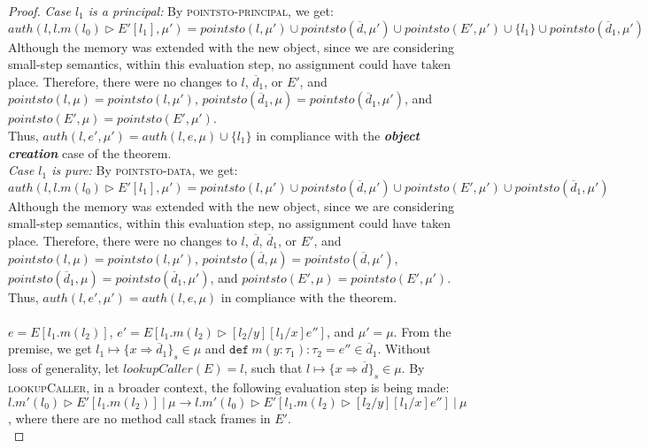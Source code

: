 \documentclass{llncs}
\newcommand{\keywadj}[1]{\mathtt{#1}}
\newcommand{\keyw}[1]{\keywadj{#1}~}
\begin{document}
\begin{proof}
\noindent\textit{Case $l_1$ is a principal:} By \textsc{pointsto-principal}, we get:
\[
auth(l, l.m(l_0) \rhd E'[l_1], \mu') = pointsto(l, \mu') \cup pointsto(\overline{d}, \mu') \cup pointsto(E', \mu') \cup \{ l_1 \} \cup pointsto(\overline{d}_1, \mu')
\]
Although the memory was extended with the new object, since we are considering small-step semantics, within this evaluation step, no assignment could have taken place. Therefore, there were no changes to $l$, $\overline{d}_1$, or $E'$, and $pointsto(l, \mu) = pointsto(l, \mu')$, $pointsto(\overline{d}_1, \mu) = pointsto(\overline{d}_1, \mu')$, and $pointsto(E', \mu) = pointsto(E', \mu')$.\\

\noindent Thus, $auth(l, e', \mu') = auth(l, e, \mu) \cup \{ l_1 \}$ in compliance with the \textbf{\textit{object creation}} case of the theorem.\\

\noindent\textit{Case $l_1$ is pure:} By \textsc{pointsto-data}, we get:
\[
auth(l, l.m(l_0) \rhd E'[l_1], \mu') = pointsto(l, \mu') \cup pointsto(\overline{d}, \mu') \cup pointsto(E', \mu') \cup pointsto(\overline{d}_1, \mu')
\]
Although the memory was extended with the new object, since we are considering small-step semantics, within this evaluation step, no assignment could have taken place. Therefore, there were no changes to $l$, $\overline{d}$, $\overline{d}_1$, or $E'$, and $pointsto(l, \mu) = pointsto(l, \mu')$, $pointsto(\overline{d}, \mu) = pointsto(\overline{d}, \mu')$, $pointsto(\overline{d}_1, \mu) = pointsto(\overline{d}_1, \mu')$, and $pointsto(E', \mu) = pointsto(E', \mu')$.\\

\noindent Thus, $auth(l, e', \mu') = auth(l, e, \mu)$ in compliance with the theorem.\\\\


\noindent{}
$e = E[l_1.m(l_2)]$, $e' = E[l_1.m(l_2) \rhd [l_2/y] [l_1/x] e'']$, and $\mu' = \mu$. From the premise, we get $l_1 \mapsto \{ x \Rightarrow \overline{d}_1 \}_{s} \in \mu$ and $\keyw{def} m(y : \tau_1) : \tau_2 = e'' \in \overline{d}_1$. Without loss of generality, let $lookupCaller(E) = l$, such that $l \mapsto \{ x \Rightarrow \overline{d} \}_{s} \in \mu$. By \textsc{lookupCaller}, in a broader context, the following evaluation step is being made: \mbox{$l.m'(l_0) \rhd E'[l_1.m(l_2)]~|~\mu \longrightarrow l.m'(l_0) \rhd E'[l_1.m(l_2) \rhd [l_2/y] [l_1/x] e'']~|~\mu$}, where there are no method call stack frames in $E'$.\\


\end{proof}
\end{document}
